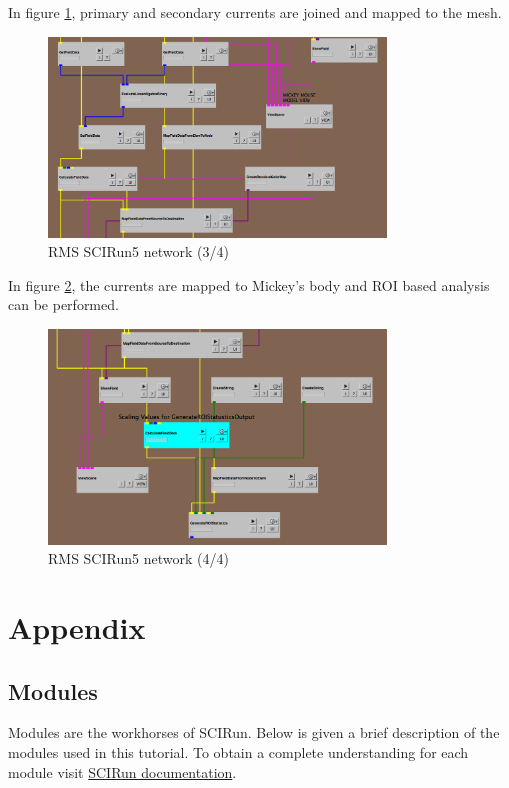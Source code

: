 \documentclass[fleqn,11pt,openany]{book}
\begin{document}
In figure \ref{fig:tms3}, primary and secondary currents are joined and mapped to the mesh.

 \begin{figure}[!h]
\centering
\includegraphics[width=0.8\textwidth]{BrainStimulation_figures/tms3.png}
\caption{ RMS SCIRun5 network (3/4)}
\label{fig:tms3}
\end{figure}

In figure \ref{fig:tms4}, the currents are mapped to Mickey's body and ROI based analysis can be performed.


 \begin{figure}[!h]
\centering
\includegraphics[width=0.8\textwidth]{BrainStimulation_figures/tms4.png}
\caption{ RMS SCIRun5 network (4/4)}
\label{fig:tms4}
\end{figure}

\chapter{Appendix}

\section{Modules}

Modules are the workhorses of SCIRun. Below is given a brief description of the modules used in this tutorial. To obtain a complete understanding for each module visit \href{http://www.sci.utah.edu/software/scirun.html}{SCIRun documentation}.
\end{document}
